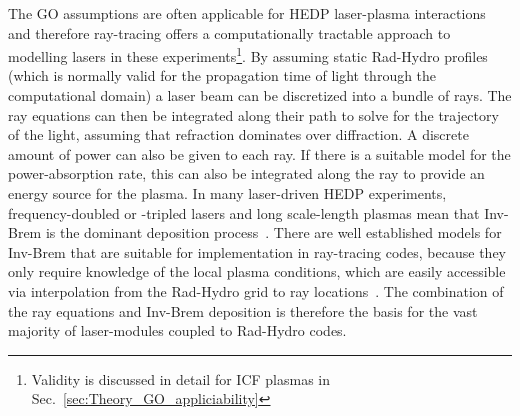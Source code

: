 The \ac{GO} assumptions are often applicable for \ac{HEDP} laser-plasma interactions and therefore ray-tracing offers a computationally tractable approach to modelling lasers in these experiments\footnote{Validity is discussed in detail for \ac{ICF} plasmas in Sec.~\ref{sec:Theory_GO_appliciability}}.
By assuming static \ac{Rad-Hydro} profiles (which is normally valid for the propagation time of light through the computational domain) a laser beam can be discretized into a bundle of rays.
The ray equations can then be integrated along their path to solve for the trajectory of the light, assuming that refraction dominates over diffraction.
A discrete amount of power can also be given to each ray.
If there is a suitable model for the power-absorption rate, this can also be integrated along the ray to provide an energy source for the plasma.
In many laser-driven \ac{HEDP} experiments, frequency-doubled or -tripled lasers and long scale-length plasmas mean that \ac{Inv-Brem} is the dominant deposition process~\cite{schmitt_importance_2023,schmitt_importance_2023-1}.
There are well established models for \ac{Inv-Brem} that are suitable for implementation in ray-tracing codes, because they only require knowledge of the local plasma conditions, which are easily accessible via interpolation from the \ac{Rad-Hydro} grid to ray locations~\cite{huba_nrl_2013,johnston_correct_1973}.
The combination of the ray equations and \ac{Inv-Brem} deposition is therefore the basis for the vast majority of laser-modules coupled to \ac{Rad-Hydro} codes.


